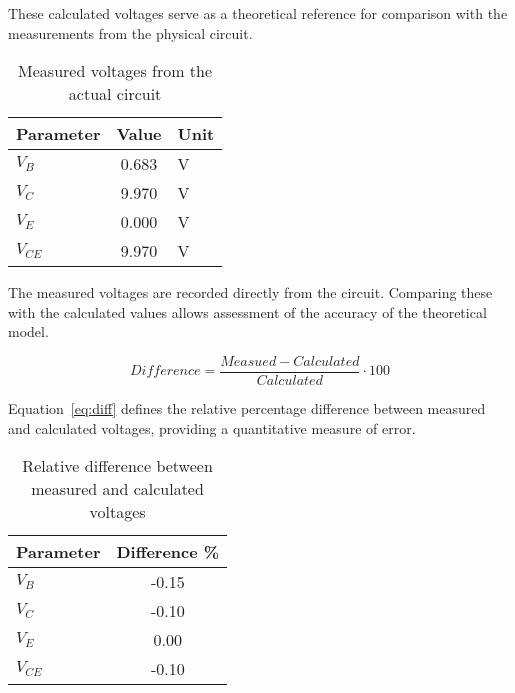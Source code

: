 \documentclass{article}
\begin{document}
These calculated voltages serve as a theoretical reference for comparison with the measurements from the physical circuit.

\begin{table}[H]%
    \centering
    \caption{Measured voltages from the actual circuit}
    \begin{tabular}{l S[table-format=2.3] l}
        \toprule
        Parameter & {Value} & {Unit} \\
        \midrule
        \(V_B\)     & 0.683 & \si{\volt} \\
        \(V_C\)     & 9.970 & \si{\volt} \\
        \(V_E\)     & 0.000 & \si{\volt} \\
        \(V_{CE}\)  & 9.970 & \si{\volt} \\
        \bottomrule
    \end{tabular}%
    \label{tab:2c}%
\end{table}%

The measured voltages are recorded directly from the circuit.  
Comparing these with the calculated values allows assessment of the accuracy of the theoretical model.

\begin{equation}%
\label{eq:diff}
    Difference = \frac{Measued - Calculated}{Calculated} \cdot 100
\end{equation}

Equation~\ref{eq:diff} defines the relative percentage difference between measured and calculated voltages, providing a quantitative measure of error.

\begin{table}[H]%
    \centering
    \caption{Relative difference between measured and calculated voltages}
    \begin{tabular}{l S[table-format=3.2]}
        \toprule
        Parameter & {Difference \%} \\
        \midrule
        \(V_B\)     & -0.15 \\
        \(V_C\)     & -0.10 \\
        \(V_E\)     &  0.00 \\
        \(V_{CE}\)  & -0.10 \\
        \bottomrule
    \end{tabular}%
    \label{tab:2diff}%
\end{table}%
\end{document}
